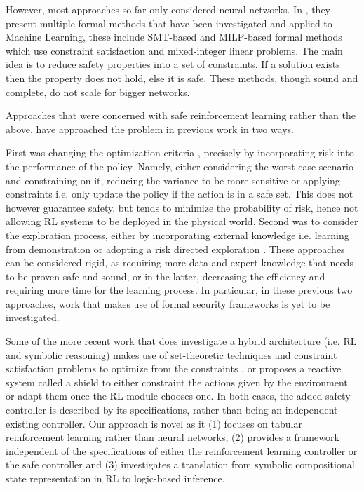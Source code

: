 \documentclass[a4paper,11pt]{article}
\begin{document}
\medskip

However, most approaches so far only considered neural networks. In \cite{urban2021}, they present multiple formal methods that have been investigated 
and applied to Machine Learning, these include SMT-based and MILP-based formal methods which use constraint satisfaction and mixed-integer linear problems. The main idea is to reduce safety properties into a set of 
constraints. If a solution exists then the property does not hold, else it is safe. 
These methods, though sound and complete, do not scale for bigger networks.

\medskip

Approaches that were concerned with safe reinforcement learning rather than the above, have approached the problem in previous work \cite{Garca2015ACS} in two ways. 

First was changing the optimization criteria \cite{rockafellar2000}, precisely by incorporating risk into the performance of the policy.
Namely, either considering the worst case scenario and constraining on it, reducing the variance to be more sensitive or applying constraints i.e. only update the policy if the action is in a safe set. 
This does not however guarantee safety, but tends to minimize the probability of risk, hence not allowing RL systems to be deployed in the physical world. 
Second was to consider the exploration process, either by incorporating external knowledge i.e. learning from demonstration \cite{Siebel2007EvolutionaryRL} or adopting a risk directed exploration \cite{law2005}. These approaches can be considered rigid, 
as requiring more data and expert knowledge that needs to be proven safe and sound, or in the latter, decreasing the efficiency and requiring more time for the learning process. 
In particular, in these previous two approaches, work that makes use of formal security frameworks is yet to be investigated. 

\medskip

Some of the more recent work that does investigate a hybrid architecture (i.e. RL and symbolic reasoning) makes use of
set-theoretic techniques and constraint satisfaction problems to optimize from the constraints \cite{Li2021SafeRL}, or proposes a reactive system called a shield \cite{alshiekh2017} to either constraint the actions given by the environment or adapt them once the RL module chooses one. 
In both cases, the added safety controller is described by its specifications, rather than being an independent existing controller. 
\newline 
Our approach is novel as it (1) focuses on tabular reinforcement learning rather than neural networks, (2) provides a framework independent of the specifications of either 
the reinforcement learning controller or the safe controller and (3) investigates a translation from  
symbolic compositional state representation in RL to logic-based inference. 
\end{document}
